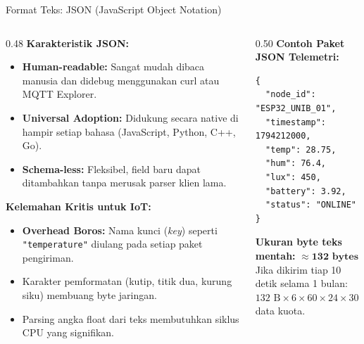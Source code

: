 \documentclass[aspectratio=169,10pt]{beamer}
\begin{document}
\begin{frame}[fragile]{Format Teks: JSON (JavaScript Object Notation)}
    \begin{columns}[T]
        \begin{column}{0.48\textwidth}
            \textbf{Karakteristik JSON:}
            \begin{itemize}
                \item \textbf{Human-readable:} Sangat mudah dibaca manusia dan didebug menggunakan curl atau MQTT Explorer.
                \item \textbf{Universal Adoption:} Didukung secara native di hampir setiap bahasa (JavaScript, Python, C++, Go).
                \item \textbf{Schema-less:} Fleksibel, field baru dapat ditambahkan tanpa merusak parser klien lama.
            \end{itemize}
            \vspace{4pt}
            \textbf{Kelemahan Kritis untuk IoT:}
            \begin{itemize}
                \item \textbf{Overhead Boros:} Nama kunci (\textit{key}) seperti \texttt{"temperature"} diulang pada setiap paket pengiriman.
                \item Karakter pemformatan (kutip, titik dua, kurung siku) membuang byte jaringan.
                \item Parsing angka float dari teks membutuhkan siklus CPU yang signifikan.
            \end{itemize}
        \end{column}
        \begin{column}{0.50\textwidth}
            \textbf{Contoh Paket JSON Telemetri:}
            \begin{lstlisting}[style=slidecode]
{
  "node_id": "ESP32_UNIB_01",
  "timestamp": 1794212000,
  "temp": 28.75,
  "hum": 76.4,
  "lux": 450,
  "battery": 3.92,
  "status": "ONLINE"
}
            \end{lstlisting}
            \vspace{2pt}
            \textbf{Ukuran byte teks mentah:} $\approx \mathbf{132\text{ bytes}}$\\
            Jika dikirim tiap 10 detik selama 1 bulan:\\
            $132\text{ B} \times 6 \times 60 \times 24 \times 30 \approx \mathbf{34{,}2\text{ MB}}$ data kuota.
        \end{column}
    \end{columns}
\end{frame}
\end{document}
